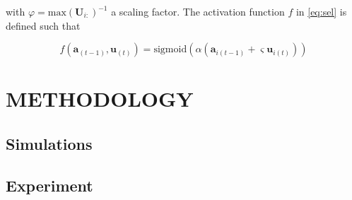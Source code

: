 \documentclass[letterpaper, 10 pt, conference]{ieeeconf}  %
\begin{document}
	\noindent with $\varphi = \mathrm{max}(\mathbf{U}_{i:})^{-1}$ a scaling factor. The activation function $f$ in \eqref{eq:sel} is defined such that

	\begin{equation}
	f\left(\mathbf{a}_{(t-1)}, \mathbf{u}_{(t)}\right) = \mathrm{sigmoid} \left(\alpha \left(\mathbf{a}_{i(t-1)} + \varsigma \mathbf{u}_{i(t)}\right)\right)
	\label{eq:sel-fa}
	\end{equation}

	


	

%	
%			
%	
	
	\section{METHODOLOGY}
	\label{sec:methodology}

	\subsection{Simulations}
	
	\subsection{Experiment}
	
\end{document}
